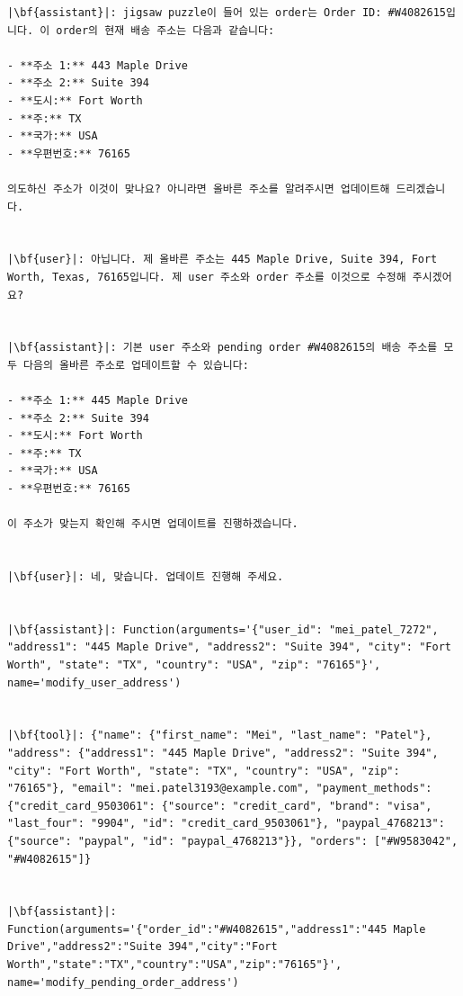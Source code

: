 \begin{verbatim}
|\bf{assistant}|: jigsaw puzzle이 들어 있는 order는 Order ID: #W4082615입니다. 이 order의 현재 배송 주소는 다음과 같습니다:

- **주소 1:** 443 Maple Drive
- **주소 2:** Suite 394
- **도시:** Fort Worth
- **주:** TX
- **국가:** USA
- **우편번호:** 76165

의도하신 주소가 이것이 맞나요? 아니라면 올바른 주소를 알려주시면 업데이트해 드리겠습니다.


|\bf{user}|: 아닙니다. 제 올바른 주소는 445 Maple Drive, Suite 394, Fort Worth, Texas, 76165입니다. 제 user 주소와 order 주소를 이것으로 수정해 주시겠어요?


|\bf{assistant}|: 기본 user 주소와 pending order #W4082615의 배송 주소를 모두 다음의 올바른 주소로 업데이트할 수 있습니다:

- **주소 1:** 445 Maple Drive
- **주소 2:** Suite 394
- **도시:** Fort Worth
- **주:** TX
- **국가:** USA
- **우편번호:** 76165

이 주소가 맞는지 확인해 주시면 업데이트를 진행하겠습니다.


|\bf{user}|: 네, 맞습니다. 업데이트 진행해 주세요.


|\bf{assistant}|: Function(arguments='{"user_id": "mei_patel_7272", "address1": "445 Maple Drive", "address2": "Suite 394", "city": "Fort Worth", "state": "TX", "country": "USA", "zip": "76165"}', name='modify_user_address')


|\bf{tool}|: {"name": {"first_name": "Mei", "last_name": "Patel"}, "address": {"address1": "445 Maple Drive", "address2": "Suite 394", "city": "Fort Worth", "state": "TX", "country": "USA", "zip": "76165"}, "email": "mei.patel3193@example.com", "payment_methods": {"credit_card_9503061": {"source": "credit_card", "brand": "visa", "last_four": "9904", "id": "credit_card_9503061"}, "paypal_4768213": {"source": "paypal", "id": "paypal_4768213"}}, "orders": ["#W9583042", "#W4082615"]}


|\bf{assistant}|: Function(arguments='{"order_id":"#W4082615","address1":"445 Maple Drive","address2":"Suite 394","city":"Fort Worth","state":"TX","country":"USA","zip":"76165"}', name='modify_pending_order_address')



\end{verbatim}
